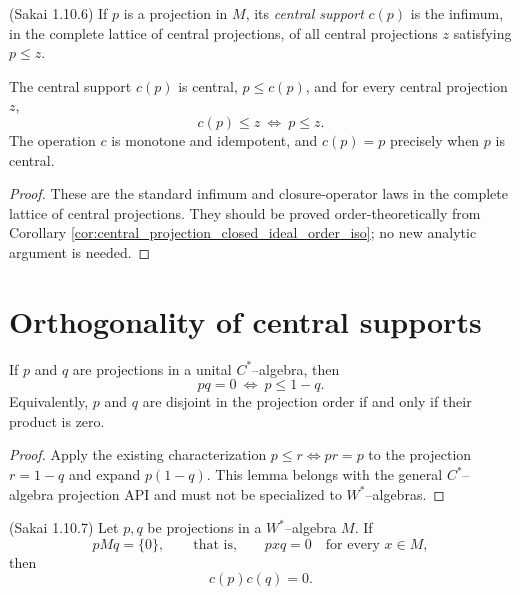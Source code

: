 \begin{definition}
  \label{def:central_support_Sak_1_10_6} (Sakai 1.10.6)
  \notready
  If $p$ is a projection in $M$, its \emph{central support} $c(p)$ is the infimum, in the complete
  lattice of central projections, of all central projections $z$ satisfying $p\leq z$.
\end{definition}

\begin{proposition}
  \label{prop:central_support_characterization}
  \notready
  The central support $c(p)$ is central, $p\leq c(p)$, and for every central projection $z$,
  \[
    c(p)\leq z\ \Longleftrightarrow\ p\leq z.
  \]
  The operation $c$ is monotone and idempotent, and $c(p)=p$ precisely when $p$ is central.
\end{proposition}

\begin{proof}
  \notready
  These are the standard infimum and closure-operator laws in the complete lattice of central
  projections.  They should be proved order-theoretically from Corollary
  \ref{cor:central_projection_closed_ideal_order_iso}; no new analytic argument is needed.
\end{proof}

\section{Orthogonality of central supports}

\begin{lemma}
  \label{lem:projection_mul_eq_zero_iff_le_complement}
  \notready
  If $p$ and $q$ are projections in a unital $C^{*}$--algebra, then
  \[
    pq=0\ \Longleftrightarrow\ p\leq 1-q.
  \]
  Equivalently, $p$ and $q$ are disjoint in the projection order if and only if their product is
  zero.
\end{lemma}

\begin{proof}
  \notready
  Apply the existing characterization $p\leq r\iff pr=p$ to the projection $r=1-q$ and expand
  $p(1-q)$.  This lemma belongs with the general $C^{*}$--algebra projection API and must not be
  specialized to $W^{*}$--algebras.
\end{proof}

\begin{proposition}
  \label{prop:central_support_orthogonal_Sak_1_10_7} (Sakai 1.10.7)
  \notready
  Let $p,q$ be projections in a $W^{*}$--algebra $M$.  If
  \[
    pMq=\{0\},\qquad\text{that is,}\qquad pxq=0\quad\text{for every }x\in M,
  \]
  then
  \[
    c(p)c(q)=0.
  \]
\end{proposition}

